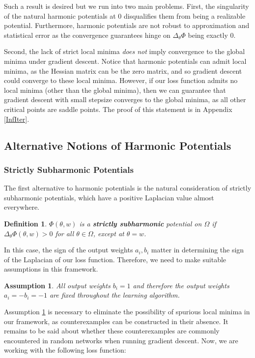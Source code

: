 \documentclass[11pt]{article}
\newtheorem{definition}[theorem]{Definition}
\newtheorem{assumption}{Assumption}
\begin{document}
Such a result is desired but we run into two main problems. First, the singularity of the natural harmonic potentials at $0$ disqualifies them from being a realizable potential. Furthermore, harmonic potentials are not robust to approximation and statistical error as the convergence guarantees hinge on $\Delta_\theta\Phi$ being exactly 0. 

Second, the lack of strict local minima {\it does not} imply convergence to the global minima under gradient descent. Notice that harmonic potentials can admit local minima, as the Hessian matrix can be the zero matrix, and so gradient descent could converge to these local minima. However, if our loss function admits no local minima (other than the global minima), then we can guarantee that gradient descent with small stepsize converges to the global minima, as all other critical points are saddle points. The proof of this statement is in Appendix \ref{InfIter}.

\subsection{Alternative Notions of Harmonic Potentials}

\subsubsection{Strictly Subharmonic Potentials}

The first alternative to harmonic potentials is the natural consideration of strictly subharmonic potentials, which have a positive Laplacian value almost everywhere. 

\begin{definition}
$\Phi(\theta,w)$ is a {\bf strictly subharmonic} potential on $\Omega$ if $\Delta_\theta \Phi(\theta,w) > 0$ for all $\theta \in \Omega$, except at $\theta = w$.
\end{definition}


In this case, the sign of the output weights $a_i, b_i$ matter in determining the sign of the Laplacian of our loss function. Therefore, we need to make suitable assumptions in this framework.

\begin{assumption}
\label{outputFixed}
All output weights $b_i = 1$ and therefore the output weights  $a_i = - b_i = -1$ are fixed throughout the learning algorithm. 
\end{assumption}

Assumption \ref{outputFixed} is necessary to eliminate the possibility of spurious local minima in our framework, as counterexamples can be constructed in their absence. It remains to be said about whether these counterexamples are commonly encountered in random networks when running gradient descent. Now, we are working with the following loss function:
\end{document}
